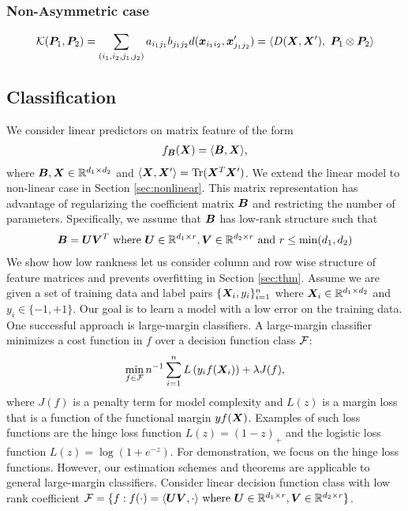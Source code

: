 \documentclass[12pt]{article}
\begin{document}
\subsubsection{Non-Asymmetric case}
\[
\mathcal{K}(\bm{P}_1,\bm{P}_2)= \sum_{(i_1,i_2,j_1,j_2)}a_{i_1j_1}b_{j_1j_2}d(\bm x_{i_1i_2},\bm x'_{j_1j_2}) = \langle D(\bm X,\bm X'),\ \bm{P}_1\otimes \bm{P}_2\rangle 
\]

\subsection{Classification}


We consider linear predictors on matrix feature of the form 
\begin{align}
f_{\bm B}(\bm X) = \langle \bm B,\bm X\rangle,
\end{align}
where $\bm B,\bm X\in\mathbb{R}^{d_1\times d_2}$ and $\langle \bm X,\bm X'\rangle = \text{Tr}(\bm X^T\bm X')$. We extend the linear model to non-linear case in Section \ref{sec:nonlinear}.
This matrix representation has advantage of regularizing the coefficient matrix $\bm B$ and restricting the number of parameters. Specifically, we assume that $\bm B$ has low-rank structure such that
\begin{align}
\bm B = \bm{U}\bm{V}^T \text{ where } \bm{U} \in\mathbb{R}^{d_1\times r} ,\bm{V}\in\mathbb{R}^{d_2\times r}\text{ and } r\leq\min(d_1,d_2)
\end{align}
We show how low rankness let us consider column and row wise structure of feature matrices and prevents overfitting in Section  \ref{sec:thm}.
Assume we are given a set of training data and label pairs $\{\bm X_i,y_i\}_{i=1}^n$ where $\bm X_i\in\mathbb{R}^{d_1\times d_2}$ and $y_i\in\{-1,+1\}$. Our goal is to learn a model with a low error on the training data. One successful approach is  large-margin classifiers.
A large-margin classifier minimizes a cost function in $f$ over a decision function class $\mathcal{F}$:
\begin{align}
\label{eq:large-margin}
\min_{f\in\mathcal{F}}n^{-1}\sum_{i=1}^n L\left(y_i f(\bm X_i)\right)+\lambda J(f),
\end{align}
where $J(f)$ is a penalty term for model complexity and $L(z)$ is a margin loss that is a function of the functional margin $yf(\bm X)$. Examples of such loss functions are the hinge loss function $L(z) = (1-z)_+$ and the logistic loss function $L(z) =\log(1+e^{-z})$.  
For demonstration, we focus on the hinge loss functions. However, our estimation schemes and theorems are applicable to general large-margin classifiers. Consider linear decision function class with low rank coefficient  $\mathcal{F} = \{f: f(\cdot) = \langle \bm{U}\bm{V},\cdot\rangle \text{ where }\bm{U}\in\mathbb{R}^{d_1\times r},\bm{V}\in\mathbb{R}^{d_2\times r}\}$.
\end{document}
